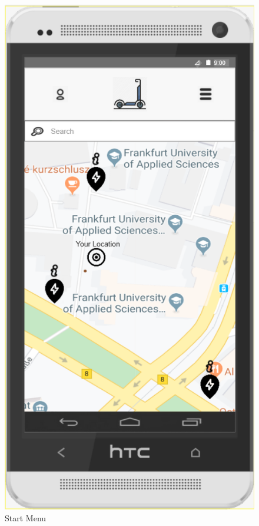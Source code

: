 \documentclass[a4paper, 12pt]{article}
\begin{document}
\begin{figure} [htbp]
  \begin{center}
    \includegraphics[scale=0.75]{images/prototypes/01-start-menu.png}
  \end{center}
  \caption{Start Menu}
\end{figure}
\end{document}
